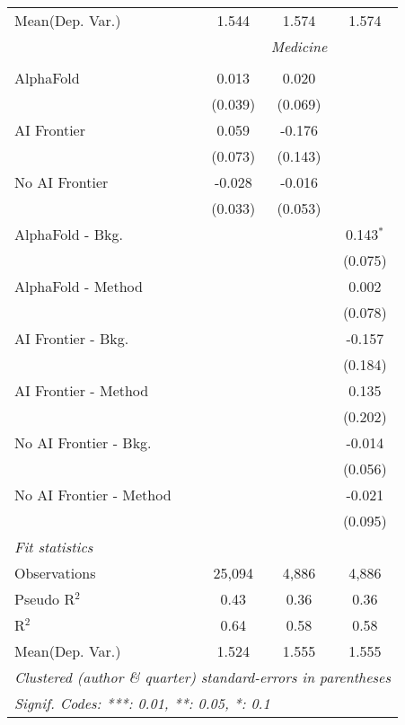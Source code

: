 \begin{tabular}{lccc}
Mean(Dep. Var.) & 1.544 & 1.574 & 1.574 \\
 & \multicolumn{3}{c}{\textit{Medicine}} \\ \\
   AlphaFold               & 0.013   & 0.020   &   \\   
                           & (0.039) & (0.069) &   \\   
   AI Frontier             & 0.059   & -0.176  &   \\   
                           & (0.073) & (0.143) &   \\   
   No AI Frontier          & -0.028  & -0.016  &   \\   
                           & (0.033) & (0.053) &   \\   
   AlphaFold - Bkg.        &         &         & 0.143$^{*}$\\   
                           &         &         & (0.075)\\   
   AlphaFold - Method      &         &         & 0.002\\   
                           &         &         & (0.078)\\   
   AI Frontier - Bkg.      &         &         & -0.157\\   
                           &         &         & (0.184)\\   
   AI Frontier - Method    &         &         & 0.135\\   
                           &         &         & (0.202)\\   
   No AI Frontier - Bkg.   &         &         & -0.014\\   
                           &         &         & (0.056)\\   
   No AI Frontier - Method &         &         & -0.021\\   
                           &         &         & (0.095)\\   
   \midrule
   \emph{Fit statistics}\\
   Observations            & 25,094  & 4,886   & 4,886\\  
   Pseudo R$^2$            & 0.43    & 0.36    & 0.36\\  
   R$^2$                   & 0.64    & 0.58    & 0.58\\  
Mean(Dep. Var.) & 1.524 & 1.555 & 1.555 \\
   \midrule \midrule
   \multicolumn{4}{l}{\emph{Clustered (author \& quarter) standard-errors in parentheses}}\\
   \multicolumn{4}{l}{\emph{Signif. Codes: ***: 0.01, **: 0.05, *: 0.1}}\\
\end{tabular}
\par\endgroup
